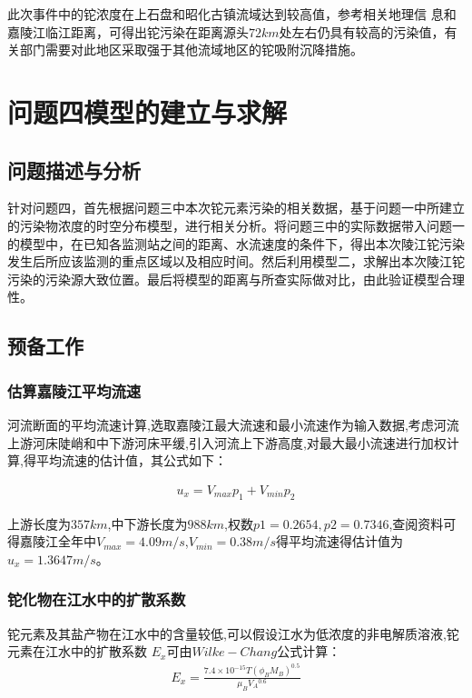 \documentclass{whutmod}
\begin{document}
此次事件中的铊浓度在上石盘和昭化古镇流域达到较高值，参考相关地理信 息和嘉陵江临江距离，可得出铊污染在距离源头$72km$处左右仍具有较高的污染值，有 关部门需要对此地区采取强于其他流域地区的铊吸附沉降措施。

	\section{问题四模型的建立与求解}
	\subsection{问题描述与分析}
	针对问题四，首先根据问题三中本次铊元素污染的相关数据，基于问题一中所建立的污染物浓度的时空分布模型，进行相关分析。将问题三中的实际数据带入问题一的模型中，在已知各监测站之间的距离、水流速度的条件下，得出本次陵江铊污染发生后所应该监测的重点区域以及相应时间。然后利用模型二，求解出本次陵江铊污染的污染源大致位置。最后将模型的距离与所查实际做对比，由此验证模型合理性。
		 \subsection{预备工作}
	\subsubsection{估算嘉陵江平均流速}
	河流断面的平均流速计算,选取嘉陵江最大流速和最小流速作为输入数据,考虑河流上游河床陡峭和中下游河床平缓,引入河流上下游高度,对最大最小流速进行加权计算,得平均流速的估计值，其公式如下\parencite{ahn2019uncertainty}：
	
	\begin{gather}
	u_{x}=V_{max}p_{1}+V_{min}p_{2}
	\end{gather}
	
	
	上游长度为$357km$,中下游长度为$988km$,权数$p1=0.2654,p2=0.7346$,查阅资料\parencite{邓朝华2017浅谈长江航道表面流速流向的数据采集}可得嘉陵江全年中$ V_{max} =4.09m/s$,$ V_{min}=0.38m/s$得平均流速得估计值为 $u_{x}=1.3647m/s$。 

	\subsubsection{铊化物在江水中的扩散系数}
	铊元素及其盐产物在江水中的含量较低,可以假设江水为低浓度的非电解质溶液,铊元素在江水中的扩散系数  $E_{x}$可由$Wilke-Chang$公式\parencite{miyabe2011estimation}计算：
	\begin{gather}
	E_{x}=\frac{7.4\times 10^{-15}T(\phi _{B}M_{B})^{0.5}}{\mu _{B}V{_{A}}^{0.6}}
	\end{gather}
	
\end{document}
